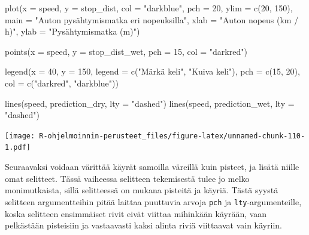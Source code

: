 \documentclass[
]{book}
\newenvironment{Shaded}{\begin{snugshade}}{\end{snugshade}}
\newcommand{\AttributeTok}[1]{\textcolor[rgb]{0.77,0.63,0.00}{#1}}
\newcommand{\DecValTok}[1]{\textcolor[rgb]{0.00,0.00,0.81}{#1}}
\newcommand{\FunctionTok}[1]{\textcolor[rgb]{0.00,0.00,0.00}{#1}}
\newcommand{\NormalTok}[1]{#1}
\newcommand{\StringTok}[1]{\textcolor[rgb]{0.31,0.60,0.02}{#1}}
\begin{document}
\begin{Shaded}
\begin{Highlighting}[]
\FunctionTok{plot}\NormalTok{(}\AttributeTok{x =}\NormalTok{ speed, }\AttributeTok{y =}\NormalTok{ stop\_dist,}
     \AttributeTok{col =} \StringTok{"darkblue"}\NormalTok{, }\AttributeTok{pch =} \DecValTok{20}\NormalTok{,}
     \AttributeTok{ylim =} \FunctionTok{c}\NormalTok{(}\DecValTok{20}\NormalTok{, }\DecValTok{150}\NormalTok{),}
     \AttributeTok{main =} \StringTok{"Auton pysähtymismatka eri nopeuksilla"}\NormalTok{,}
     \AttributeTok{xlab =} \StringTok{"Auton nopeus (km / h)"}\NormalTok{, }\AttributeTok{ylab =} \StringTok{"Pysähtymismatka (m)"}\NormalTok{)}

\FunctionTok{points}\NormalTok{(}\AttributeTok{x =}\NormalTok{ speed, }\AttributeTok{y =}\NormalTok{ stop\_dist\_wet, }\AttributeTok{pch =} \DecValTok{15}\NormalTok{, }\AttributeTok{col =} \StringTok{"darkred"}\NormalTok{)}

\FunctionTok{legend}\NormalTok{(}\AttributeTok{x =} \DecValTok{40}\NormalTok{, }\AttributeTok{y =} \DecValTok{150}\NormalTok{,}
       \AttributeTok{legend =} \FunctionTok{c}\NormalTok{(}\StringTok{"Märkä keli"}\NormalTok{, }\StringTok{"Kuiva keli"}\NormalTok{),}
       \AttributeTok{pch =} \FunctionTok{c}\NormalTok{(}\DecValTok{15}\NormalTok{, }\DecValTok{20}\NormalTok{), }\AttributeTok{col =} \FunctionTok{c}\NormalTok{(}\StringTok{"darkred"}\NormalTok{, }\StringTok{"darkblue"}\NormalTok{))}

\FunctionTok{lines}\NormalTok{(speed, prediction\_dry, }\AttributeTok{lty =} \StringTok{"dashed"}\NormalTok{)}
\FunctionTok{lines}\NormalTok{(speed, prediction\_wet, }\AttributeTok{lty =} \StringTok{"dashed"}\NormalTok{)}
\end{Highlighting}
\end{Shaded}

\texttt{[image: R-ohjelmoinnin-perusteet\_files/figure-latex/unnamed-chunk-110-1.pdf]}

Seuraavaksi voidaan värittää käyrät samoilla väreillä kuin pisteet, ja lisätä niille omat selitteet. Tässä vaiheessa selitteen tekemisestä tulee jo melko monimutkaista, sillä selitteessä on mukana pisteitä ja käyriä. Tästä syystä selitteen argumentteihin pitää laittaa puuttuvia arvoja \texttt{pch} ja \texttt{lty}-argumenteille, koska selitteen ensimmäiset rivit eivät viittaa mihinkään käyrään, vaan pelkästään pisteisiin ja vastaavasti kaksi alinta riviä viittaavat vain käyriin.
\end{document}
